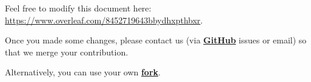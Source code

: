 \documentclass[aspectratio=169]{beamer}
\begin{document}
\begin{visual}[Welcome]
    \begin{tcolorbox}
        Feel free to modify this document here:\\ \url{https://www.overleaf.com/8452719643bbydhxpthbxr}.

        Once you made some changes, please contact us (via \href{https://github.com/UCLOUVAIN-CLUB-ELEC/visual-identity/issues}{\textbf{GitHub}} issues or email) so that we merge your contribution.

        Alternatively, you can use your own \href{https://github.com/UCLOUVAIN-CLUB-ELEC/visual-identity}{\textbf{fork}}.
    \end{tcolorbox}
\end{visual}

\begin{visual}
\end{visual}
\end{document}
